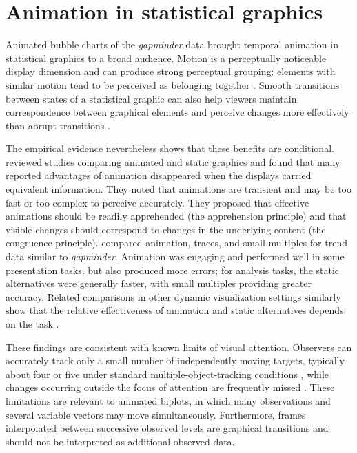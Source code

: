 \section{Animation in statistical graphics}\label{animation-in-statistical-graphics}

Animated bubble charts of the \emph{gapminder} data brought temporal animation in statistical graphics to a broad audience. Motion is a perceptually noticeable display dimension and can produce strong perceptual grouping: elements with similar motion tend to be perceived as belonging together \citep{Bartram2002, Ware2013}. Smooth transitions between states of a statistical graphic can also help viewers maintain correspondence between graphical elements and perceive changes more effectively than abrupt transitions \citep{Heer2007}.

The empirical evidence nevertheless shows that these benefits are conditional. \citet{Tversky2002} reviewed studies comparing animated and static graphics and found that many reported advantages of animation disappeared when the displays carried equivalent information. They noted that animations are transient and may be too fast or too complex to perceive accurately. They proposed that effective animations should be readily apprehended (the apprehension principle) and that visible changes should correspond to changes in the underlying content (the congruence principle). \citet{Robertson2008} compared animation, traces, and small multiples for trend data similar to \emph{gapminder}. Animation was engaging and performed well in some presentation tasks, but also produced more errors; for analysis tasks, the static alternatives were generally faster, with small multiples providing greater accuracy. Related comparisons in other dynamic visualization settings similarly show that the relative effectiveness of animation and static alternatives depends on the task \citep{Archambault2011, Brehmer2020}.

These findings are consistent with known limits of visual attention. Observers can accurately track only a small number of independently moving targets, typically about four or five under standard multiple-object-tracking conditions \citep{Pylyshyn1988}, while changes occurring outside the focus of attention are frequently missed \citep{Rensink2002}. These limitations are relevant to animated biplots, in which many observations and several variable vectors may move simultaneously. Furthermore, frames interpolated between successive observed levels are graphical transitions and should not be interpreted as additional observed data.

